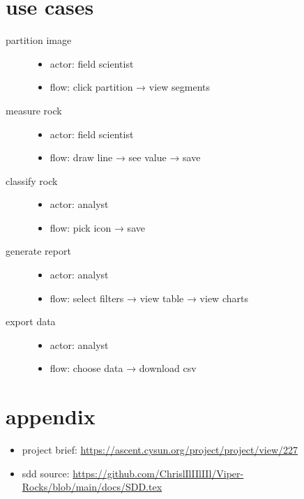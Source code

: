 \documentclass{article}
\begin{document}
\section{use cases}
\begin{description}
  \item[partition image]
    \begin{itemize}
      \item actor: field scientist
      \item flow: click partition → view segments
    \end{itemize}
  \item[measure rock]
    \begin{itemize}
      \item actor: field scientist
      \item flow: draw line → see value → save
    \end{itemize}
  \item[classify rock]
    \begin{itemize}
      \item actor: analyst
      \item flow: pick icon → save
    \end{itemize}
  \item[generate report]
    \begin{itemize}
      \item actor: analyst
      \item flow: select filters → view table → view charts
    \end{itemize}
  \item[export data]
    \begin{itemize}
      \item actor: analyst
      \item flow: choose data → download csv
    \end{itemize}
\end{description}

\section{appendix}
\begin{itemize}
  \item project brief: \url{https://ascent.cysun.org/project/project/view/227}
  \item sdd source: \url{https://github.com/ChrislIlIIlIIl/Viper-Rocks/blob/main/docs/SDD.tex}
\end{itemize}
\end{document}
